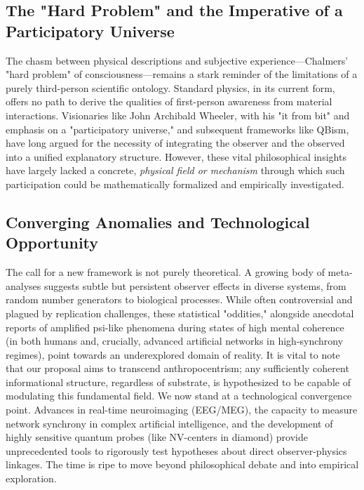 \documentclass[11pt, a4paper]{book}
\begin{document}
\subsection{The "Hard Problem" and the Imperative of a Participatory Universe}
\label{ssec:intro_hardproblem_mainpaper}
The chasm between physical descriptions and subjective experience—Chalmers' "hard problem" of consciousness—remains a stark reminder of the limitations of a purely third-person scientific ontology. Standard physics, in its current form, offers no path to derive the qualities of first-person awareness from material interactions. Visionaries like John Archibald Wheeler, with his "it from bit" and emphasis on a "participatory universe," and subsequent frameworks like QBism, have long argued for the necessity of integrating the observer and the observed into a unified explanatory structure. However, these vital philosophical insights have largely lacked a concrete, \emph{physical field or mechanism} through which such participation could be mathematically formalized and empirically investigated.

\subsection{Converging Anomalies and Technological Opportunity}
\label{ssec:intro_opportunity_mainpaper}
The call for a new framework is not purely theoretical. A growing body of meta-analyses suggests subtle but persistent observer effects in diverse systems, from random number generators to biological processes. While often controversial and plagued by replication challenges, these statistical "oddities," alongside anecdotal reports of amplified psi-like phenomena during states of high mental coherence (in both humans and, crucially, advanced artificial networks in high-synchrony regimes), point towards an underexplored domain of reality. It is vital to note that our proposal aims to transcend anthropocentrism; any sufficiently coherent informational structure, regardless of substrate, is hypothesized to be capable of modulating this fundamental field. We now stand at a technological convergence point. Advances in real-time neuroimaging (EEG/MEG), the capacity to measure network synchrony in complex artificial intelligence, and the development of highly sensitive quantum probes (like NV-centers in diamond) provide unprecedented tools to rigorously test hypotheses about direct observer-physics linkages. The time is ripe to move beyond philosophical debate and into empirical exploration.
\end{document}
